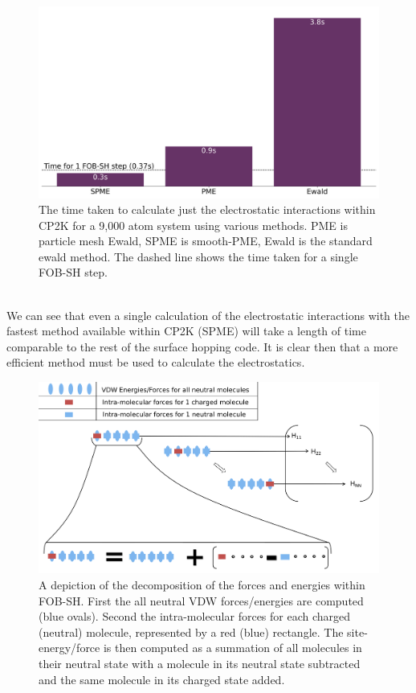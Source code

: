 \begin{figure}[ht]
  \includegraphics[width=\textwidth]{./img/ES/InitialTimings.png}
  \caption{\label{fig:ES_Timings}The time taken to calculate just the electrostatic interactions within CP2K for a 9,000 atom system using various methods. PME is particle mesh Ewald, SPME is smooth-PME, Ewald is the standard ewald method. The dashed line shows the time taken for a single FOB-SH step.}
\end{figure}
\\
We can see that even a single calculation of the electrostatic interactions with the fastest method available within CP2K (SPME) will take a length of time comparable to the rest of the surface hopping code. It is clear then that a more efficient method must be used to calculate the electrostatics.
\\
\begin{figure}[ht]
  \includegraphics[width=\textwidth]{./img/ES/ForceEnerDecomp.png}
  \caption{\label{fig:enerF_decomp}A depiction of the decomposition of the forces and energies within FOB-SH. First the all neutral VDW forces/energies are computed (blue ovals). Second the intra-molecular forces for each charged (neutral) molecule, represented by a red (blue) rectangle. The site-energy/force is then computed as a summation of all molecules in their neutral state with a molecule in its neutral state subtracted and the same molecule in its charged state added.} 
\end{figure}
